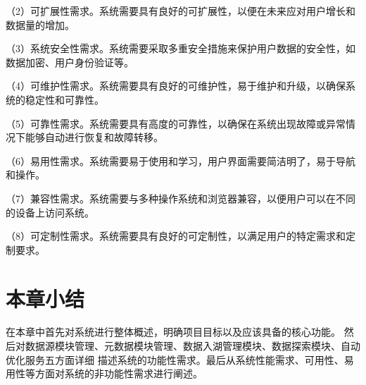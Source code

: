 （2）可扩展性需求。系统需要具有良好的可扩展性，以便在未来应对用户增长和数据量的增加。

（3）系统安全性需求。系统需要采取多重安全措施来保护用户数据的安全性，如数据加密、用户身份验证等。

（4）可维护性需求。系统需要具有良好的可维护性，易于维护和升级，以确保系统的稳定性和可靠性。

（5）可靠性需求。系统需要具有高度的可靠性，以确保在系统出现故障或异常情况下能够自动进行恢复和故障转移。

（6）易用性需求。系统需要易于使用和学习，用户界面需要简洁明了，易于导航和操作。

（7）兼容性需求。系统需要与多种操作系统和浏览器兼容，以便用户可以在不同的设备上访问系统。

（8）可定制性需求。系统需要具有良好的可定制性，以满足用户的特定需求和定制要求。

\section{本章小结}

在本章中首先对系统进行整体概述，明确项目目标以及应该具备的核心功能。
然后对数据源模块管理、元数据模块管理、数据入湖管理模块、数据探索模块、自动优化服务五方面详细
描述系统的功能性需求。最后从系统性能需求、可用性、易用性等方面对系统的非功能性需求进行阐述。
